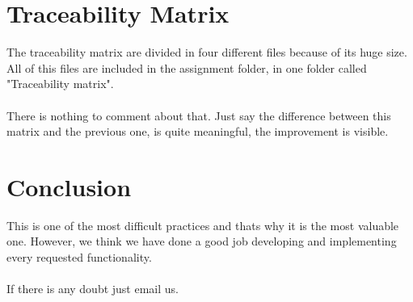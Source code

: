 \documentclass[12pt]{article}
\begin{document}
\section{Traceability Matrix}
The traceability matrix are divided in four different files because of its huge size. All of this files are included in the assignment folder, in one folder called "Traceability matrix".\\\\
There is nothing to comment about that. Just say the difference between this matrix and the previous one, is quite meaningful, the improvement is visible.\\

\section{Conclusion}
This is one of the most difficult practices and thats why it is the most valuable one. However, we think we have done a good job developing and implementing every requested functionality.\\\\
If there is any doubt just email us.
	
	
\end{document}
